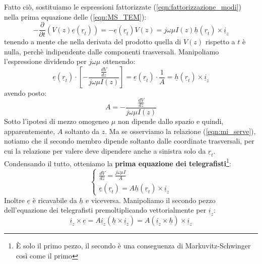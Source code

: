 \documentclass{book}
\begin{document}
    Fatto ciò, sostituiamo le espressioni fattorizzate (\ref{eqn:fattorizzazione_modi}) nella prima equazione delle (\ref{eqn:MS_TEM}):
    \begin{equation}
        -\frac{\partial}{\partial t}(V(z)\underline{e}(\underline{r}_{t})) = - \underline{e}(\underline{r}_{t})V(z) = j \omega \mu I(z)\underline{h}(\underline{r}_{t}) \times \underline{i}_{z}
    \end{equation}
    tenendo a mente che nella derivata del prodotto quella di $V(z)$ rispetto a $t$ è nulla, perchè indipendente dalle componenti trasversali.
    Manipoliamo l'espressione dividendo per $j \omega \mu$ ottenendo:
    \begin{equation}
        \label{eqn:mi_serve}
        \underline{e}(\underline{r}_{t}) \cdot [-\frac{\displaystyle \frac{dV}{dz}}{j \omega \mu I(z)}] = \underline{e}(\underline{r}_{t}) \cdot \frac{1}{A}= \underline{h}(\underline{r}_{t}) \times \underline{i}_{z}
    \end{equation}
    avendo posto:
    \begin{equation}
         A = -\frac{\displaystyle \frac{dV}{dz}}{j \omega \mu I(z)}
    \end{equation}
    Sotto l'ipotesi di mezzo omogeneo $\mu$ non dipende dallo spazio e quindi, apparentemente, $A$ soltanto da $z$. Ma se osserviamo
    la relazione (\ref{eqn:mi_serve}), notiamo che il secondo membro dipende soltanto dalle coordinate trasversali, per cui la relazione per valere deve 
    dipendere anche a sinistra solo da $\underline{r}_{t}$.
    Condensando il tutto, otteniamo la \textbf{prima equazione dei telegrafisti}\footnote{È solo il primo pezzo, il secondo è una conseguenza di Markuvitz-Schwinger così come il primo}:
    \begin{equation}
        \label{eqn:prima_eq_telegrafisti}
        \begin{cases}
            \displaystyle \frac{dV}{dz} = \frac{j \omega \mu I}{A} \\
            \underline{e}(\underline{r}_{t}) = A \underline{h}(\underline{r}_{t}) \times \underline{i}_{z}
        \end{cases}
    \end{equation}
    Inoltre $\underline{e}$ è ricavabile da $\underline{h}$ e viceversa. Manipoliamo 
    il secondo pezzo dell'equazione dei telegrafisti premoltiplicando vettorialmente per $\underline{i}_{z}$:
    \begin{equation}
        \underline{i}_{z} \times \underline{e} = A \underline{i}_{z}(\underline{h} \times \underline{i}_{z}) = A (\underline{i}_{z} \times \underline{h}) \times \underline{i}_{z}
    \end{equation}
\end{document}
